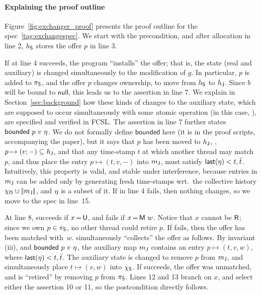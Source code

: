 \paragraph{Explaining the proof outline}
\label{sec:exproof}

Figure~\ref{fig:exchanger_proof} presents the proof outline for the
spec~\eqref{tag:exchangespec}.
%
We start with the precondition, and after allocation in line 2,
$h_{\mathsf{S}}$ stores the offer $p$ in line 3.

If  at line 4 succeeds, the program ``installs'' the offer;
that is, the state (real and auxiliary) is changed simultaneously to
the modification of $g$. In particular, $p$ is added to $\pi_{\mathsf{S}}$, and
the offer $p$ changes ownership, to move from $h_{\mathsf{S}}$ to $h_{\mathsf{J}}$.
Since $b$ will be bound to $\mathsf{null}$, this leads us to the
assertion in line 7. We explain in Section~\ref{sec:background} how
these kinds of changes to the auxiliary state, which are supposed to
occur simultaneously with some atomic operation (in this case,
), are specified and verified in FCSL. The assertion in line
7 further states $\mathsf{bounded}\ p\ v\ \eta$. We do not formally
define $\mathsf{bounded}$ here (it is in the proof scripts,
accompanying the paper), but it says that $p$ has been moved to
$h_{\mathsf{J}}$, \ie, $p \mapsto (v; -) \subseteq h_{\mathsf{J}}$, and that any
time-stamp $t$ at which another thread may match $p$, and thus place
the entry $p \mapsto (t, v,-)$ into ${m_{\mathsf{J}}}$, must satisfy
$\mathsf{last}(\eta) < t, \bar{t}$. Intuitively, this property is
valid, and stable under interference, because entries in ${m_{\mathsf{J}}}$
can be added only by generating fresh time-stamps wrt.~the collective
history $\histo \hunion \mygather{\pending}$, and $\eta$ is a subset
of it.
%
If  in line 4 fails, then nothing changes, so we move to the
spec in line~15.

At line 8,  succeeds if $x\,{=}\,{\mathsf{U}}$, and fails if
$x\,{=}\,{\mathsf{M}\ w}$. Notice that $x$ cannot be ${\mathsf{R}}$; since we
own $p \in \pi_{\mathsf{S}}$, no other thread could retire $p$.
%
If  fails, then the offer has been matched with~$w$. 
simultaneously ``collects'' the offer as follows. By invariant (iii),
and $\mathsf{bounded}\ p\ v\ \eta$, the auxiliary map ${m_{\mathsf{J}}}$
contains an entry $p \mapsto (t, v, w)$, where $\mathsf{last}(\eta) <
t, \bar{t}$. The auxiliary state is changed to remove $p$ from
${m_{\mathsf{J}}}$, and simultaneously place $t \mapsto (v, w)$ into $\chi_{\mathsf{S}}$.
%
If  succeeds, the offer was unmatched, and is ``retired'' by
removing $p$ from $\pi_{\mathsf{S}}$.
%
Lines 12 and 13 branch on $x$, and select either the assertion 10 or
11, so the postcondition directly follows.

